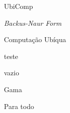\documentclass[diss]{mdtfurb}
\begin{document}

\begin{listofabbrv}{UbiComp}
   \item [BNF] \textit{Backus-Naur Form}
   \item [UbiComp] Computação Ubíqua
\end{listofabbrv}


\begin{listofsymbols}{teste}
  \item [$\varnothing$] vazio
  \item [$\Gamma$]  Gama
  \item [$\forall$] Para todo
\end{listofsymbols}

\tableofcontents


\setlength{\baselineskip}{1.5\baselineskip}





\setlength{\baselineskip}{\baselineskip}


\begingroup
\setlength\bibitemsep{12pt}
\printbibliography[heading=bibintoc,title={Refer{\^e}ncias}]
\endgroup











\end{document}
